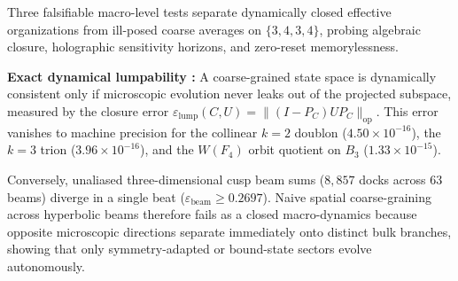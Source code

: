 Three falsifiable macro-level tests separate dynamically closed effective organizations from ill-posed coarse averages
on $\{3,4,3,4\}$, probing algebraic closure, holographic sensitivity horizons, and zero-reset memorylessness.

\textbf{Exact dynamical lumpability \cite{kemeny1960}:} A coarse-grained state space is dynamically consistent only if
microscopic evolution never leaks out of the projected subspace, measured by the closure error
$\varepsilon_{\mathrm{lump}}(C, U) = \|(I - P_C) U P_C\|_{\mathrm{op}}$. This error vanishes to machine precision for
the collinear $k = 2$ doublon ($4.50 \times 10^{-16}$), the $k = 3$ trion ($3.96 \times 10^{-16}$), and the $W(F_4)$
orbit quotient on $B_3$ ($1.33 \times 10^{-15}$).

Conversely, unaliased three-dimensional cusp beam sums ($8{,}857$ docks across $63$ beams) diverge in a single beat
($\varepsilon_{\mathrm{beam}} \ge 0.2697$). Naive spatial coarse-graining across hyperbolic beams therefore fails as a
closed macro-dynamics because opposite microscopic directions separate immediately onto distinct bulk branches, showing
that only symmetry-adapted or bound-state sectors evolve autonomously.

